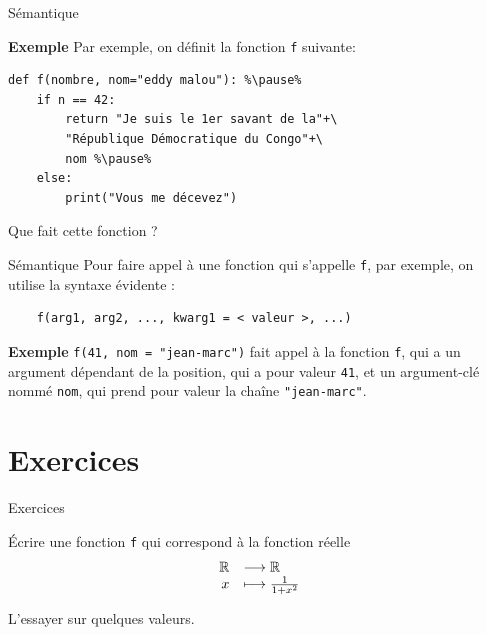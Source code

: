 \begin{frame}[fragile]{Sémantique}
\begin{block}{\textbf{Exemple}}
Par exemple, on définit la fonction \lstinline|f| suivante:\pause
\begin{lstlisting}[escapechar=\%]
def f(nombre, nom="eddy malou"): %\pause%
    if n == 42:
        return "Je suis le 1er savant de la"+\
		"République Démocratique du Congo"+\
		nom %\pause%
    else:
        print("Vous me décevez")
\end{lstlisting}
\end{block}
\pause

Que fait cette fonction ?

\end{frame}

\begin{frame}[fragile]{Sémantique}
	Pour faire appel à une fonction qui s'appelle \lstinline|f|, par exemple, on utilise la syntaxe évidente :
	\begin{lstlisting}
	f(arg1, arg2, ..., kwarg1 = < valeur >, ...)
	\end{lstlisting}
	\pause
	
	\begin{block}{\textbf{Exemple}}
	\lstinline|f(41, nom = "jean-marc")| fait appel à la fonction \lstinline|f|, qui a un argument dépendant de la position, qui a pour valeur \lstinline|41|, et un argument-clé nommé \lstinline|nom|, qui prend pour valeur la chaîne \lstinline|"jean-marc"|.
	\end{block}
\end{frame}

\section{Exercices}

\begin{frame}[fragile]{Exercices}
\begin{exo}
	Écrire une fonction \lstinline|f| qui correspond à la fonction réelle
    \[
    \begin{array}{rl}
    \mathbb R &\longrightarrow \mathbb R \\
    x &\longmapsto \frac{1}{1+x^2}
    \end{array}
    \]
    
    L'essayer sur quelques valeurs.
\end{exo}
\end{frame}

